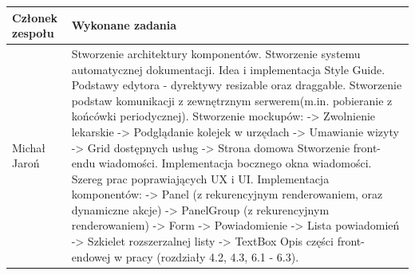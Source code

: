\documentclass[licencjacka]{pracamgr}
\begin{document}
\begin{tabularx}{\linewidth}{|l|X|} \hline
	\textbf{Członek zespołu} & \textbf{Wykonane zadania} \\
	\hline
	Michał Jaroń & Stworzenie architektury komponentów. \newline
		    Stworzenie systemu automatycznej dokumentacji. \newline
		    Idea i implementacja Style Guide. \newline
		    Podstawy edytora - dyrektywy resizable oraz draggable.\newline
		    Stworzenie podstaw komunikacji z zewnętrznym serwerem(m.in. pobieranie z końcówki periodycznej).\newline
          	Stworzenie mockupów:\newline
			-> Zwolnienie lekarskie\newline
			-> Podglądanie kolejek w urzędach\newline
			-> Umawianie wizyty\newline
			-> Grid dostępnych usług\newline
			-> Strona domowa \newline
		Stworzenie front-endu wiadomości. \newline
		Implementacja bocznego okna wiadomości.\newline
		Szereg prac poprawiających UX i UI. \newline
		Implementacja komponentów: \newline
		  -> Panel (z rekurencyjnym renderowaniem, oraz dynamiczne akcje)\newline
		  -> PanelGroup (z rekurencyjnym renderowaniem)\newline
		  -> Form \newline
		  -> Powiadomienie \newline
		  -> Lista powiadomień \newline
		  -> Szkielet rozszerzalnej listy \newline
		  -> TextBox \newline
		Opis części front-endowej w pracy (rozdziały 4.2, 4.3, 6.1 - 6.3).
	\\	
	

\end{tabularx}
\end{document}
